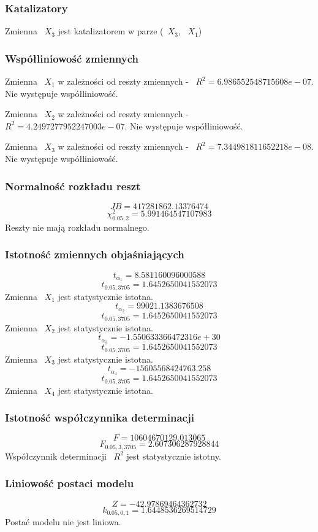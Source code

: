 \subsubsection{Katalizatory}
Zmienna ~$X_{3}$ jest katalizatorem w parze (~$X_{3}$, ~$X_{1}$)

\subsubsection{Współliniowość zmiennych}
Zmienna ~$X_{1}$ w zależności od reszty zmiennych - ~$R^2 = 6.986552548715608e-07$.
Nie występuje współliniowość.

Zmienna ~$X_{2}$ w zależności od reszty zmiennych - ~$R^2 = 4.2497277952247003e-07$.
Nie występuje współliniowość.

Zmienna ~$X_{3}$ w zależności od reszty zmiennych - ~$R^2 = 7.344981811652218e-08$.
Nie występuje współliniowość.

\subsubsection{Normalność rozkładu reszt}
\[JB = 417281862.13376474\]
\[\chi^2_{0.05, 2} = 5.991464547107983\]
Reszty nie mają rozkładu normalnego.
\subsubsection{Istotność zmiennych objaśniających}
\[t_{\alpha_{1}} = 8.581160096000588\]
\[t_{0.05, 3705} = 1.6452650041552073\]
Zmienna ~$X_{1}$ jest statystycznie istotna.
\[t_{\alpha_{2}} = 99021.1383676508\]
\[t_{0.05, 3705} = 1.6452650041552073\]
Zmienna ~$X_{2}$ jest statystycznie istotna.
\[t_{\alpha_{3}} = -1.550633366472316e+30\]
\[t_{0.05, 3705} = 1.6452650041552073\]
Zmienna ~$X_{3}$ jest statystycznie istotna.
\[t_{\alpha_{4}} = -15605568424763.258\]
\[t_{0.05, 3705} = 1.6452650041552073\]
Zmienna ~$X_{4}$ jest statystycznie istotna.
\subsubsection{Istotność współczynnika determinacji}
\[F = 10604670129.013065\]
\[F_{0.05, 3, 3705} = 2.607306287928844\]
Współczynnik determinacji ~$R^2$ jest statystycznie istotny.
\subsubsection{Liniowość postaci modelu}
\[Z = -42.97869464362732\]
\[k_{0.05, 0, 1} = 1.6448536269514729\]
Postać modelu nie jest liniowa.
